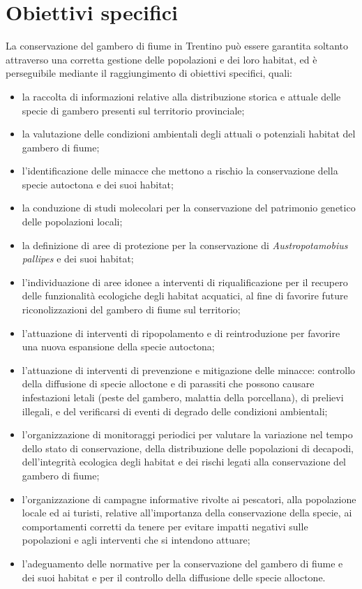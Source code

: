 \documentclass[10pt,twoside,openany,x11names,svgnames,italian,a5paper,dvipsnames,table]{memoir}
\begin{document}
\section{Obiettivi specifici}
La conservazione del gambero di fiume in Trentino può essere garantita soltanto attraverso una corretta gestione delle popolazioni e dei loro habitat, ed è perseguibile mediante il raggiungimento di obiettivi specifici, quali:
  \begin{itemize}\itemsep0pt
    \item la raccolta di informazioni relative alla distribuzione storica e attuale delle specie di gambero presenti sul territorio provinciale;
    \item la valutazione delle condizioni ambientali degli attuali o potenziali habitat del gambero di fiume;
    \item l’identificazione delle minacce che mettono a rischio la conservazione della specie autoctona e dei suoi habitat;
    \item la conduzione di studi molecolari per la conservazione del patrimonio genetico delle popolazioni locali;
    \item la definizione di aree di protezione per la conservazione di \emph{Austropotamobius pallipes} e dei suoi habitat;
    \item l’individuazione di aree idonee a interventi di riqualificazione per il recupero delle funzionalità ecologiche degli habitat acquatici, al fine di favorire future riconolizzazioni del gambero di fiume sul territorio;
    \item l’attuazione di interventi di ripopolamento e di reintroduzione per favorire una nuova espansione della specie autoctona;
    \item l’attuazione di interventi di prevenzione e mitigazione delle minacce: controllo della diffusione di specie alloctone e di parassiti che possono causare infestazioni letali (peste del gambero, malattia della porcellana), di prelievi illegali, e del verificarsi di eventi di degrado delle condizioni ambientali;
    \item l'organizzazione di monitoraggi periodici per valutare la variazione nel tempo dello stato di conservazione, della distribuzione delle popolazioni di decapodi, dell’integrità ecologica degli habitat e dei rischi legati alla conservazione del gambero di fiume;
    \item l’organizzazione di campagne informative rivolte ai pescatori, alla popolazione locale ed ai turisti, relative all’importanza della conservazione della specie, ai comportamenti corretti da tenere per evitare impatti negativi sulle popolazioni e agli interventi che si intendono attuare;
    \item l’adeguamento delle normative per la conservazione del gambero di fiume e dei suoi habitat e per il controllo della diffusione delle specie alloctone.
  \end{itemize}
\end{document}
